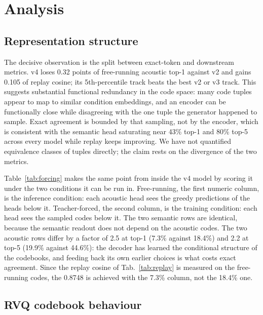 \section{Analysis}
\label{sec:analysis}

\subsection{Representation structure}

The decisive observation is the split between exact-token and downstream metrics. v4 loses 0.32 points of free-running acoustic top-1 against v2 and gains 0.105 of replay cosine; its 5th-percentile track beats the best v2 or v3 track. This suggests substantial functional redundancy in the code space: many code tuples appear to map to similar condition embeddings, and an encoder can be functionally close while disagreeing with the one tuple the generator happened to sample. Exact agreement is bounded by that sampling, not by the encoder, which is consistent with the semantic head saturating near 43\% top-1 and 80\% top-5 across every model while replay keeps improving. We have not quantified equivalence classes of tuples directly; the claim rests on the divergence of the two metrics.

Table~\ref{tab:forcing} makes the same point from inside the v4 model by scoring it under the two conditions it can be run in. Free-running, the first numeric column, is the inference condition: each acoustic head sees the greedy predictions of the heads below it. Teacher-forced, the second column, is the training condition: each head sees the sampled codes below it. The two semantic rows are identical, because the semantic readout does not depend on the acoustic codes. The two acoustic rows differ by a factor of 2.5 at top-1 (7.3\% against 18.4\%) and 2.2 at top-5 (19.9\% against 44.6\%): the decoder has learned the conditional structure of the codebooks, and feeding back its own earlier choices is what costs exact agreement. Since the replay cosine of Tab.~\ref{tab:replay} is measured on the free-running codes, the 0.8748 is achieved with the 7.3\% column, not the 18.4\% one.



\subsection{RVQ codebook behaviour}

